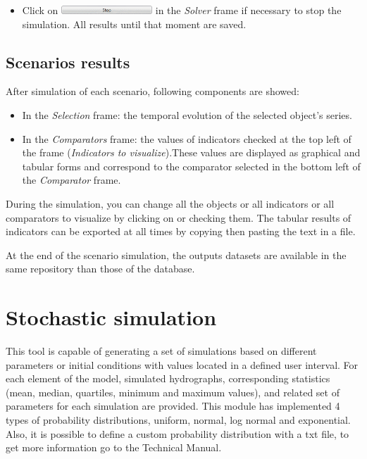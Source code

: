 \documentclass[
  letterpaper,
  DIV=11,
  numbers=noendperiod]{scrreprt}
\providecommand{\tightlist}{%
  \setlength{\itemsep}{0pt}\setlength{\parskip}{0pt}}\usepackage{longtable,booktabs,array}
\begin{document}
\begin{itemize}
\tightlist
\item
  {Click on
  \includegraphics[width=\textwidth,height=0.12in]{./figures/fig-icon_calibrator_stop.png}
  in the \emph{Solver} frame if necessary to stop the simulation. All
  results until that moment are saved.}
\end{itemize}

\hypertarget{scenarios-results}{%
\section{Scenarios results}\label{scenarios-results}}

After simulation of each scenario, following components are showed:

\begin{itemize}
\item
  In the \emph{Selection} frame: the temporal evolution of the selected
  object's series.
\item
  In the \emph{Comparators} frame: the values of indicators checked at
  the top left of the frame (\emph{Indicators to visualize}).These
  values are displayed as graphical and tabular forms and correspond to
  the comparator selected in the bottom left of the \emph{Comparator}
  frame.
\end{itemize}

During the simulation, you can change all the objects or all indicators
or all comparators to visualize by clicking on or checking them. The
tabular results of indicators can be exported at all times by copying
then pasting the text in a file.

At the end of the scenario simulation, the outputs datasets are
available in the same repository than those of the database.

\hypertarget{stochastic-simulation}{%
\chapter{Stochastic simulation}\label{stochastic-simulation}}

This tool is capable of generating a set of simulations based on
different parameters or initial conditions with values located in a
defined user interval. For each element of the model, simulated
hydrographs, corresponding statistics (mean, median, quartiles, minimum
and maximum values), and related set of parameters for each simulation
are provided. This module has implemented 4 types of probability
distributions, uniform, normal, log normal and exponential. Also, it is
possible to define a custom probability distribution with a txt file, to
get more information go to the Technical Manual.
\end{document}

